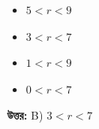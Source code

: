 \documentclass[12pt, a4paper]{article}
\begin{document}
\begin{itemize}[label={}, leftmargin=1cm, itemsep=0.5em]
    \item[\textbf{A)}] $5 < r < 9$
    \item[\textbf{B)}] $3 < r < 7$
    \item[\textbf{C)}] $1 < r < 9$
    \item[\textbf{D)}] $0 < r < 7$
\end{itemize}

\vspace{0.5em}
\begin{tcolorbox}[answerbox]
    \textbf{\color{success} উত্তর:} B) $3 < r < 7$
\end{tcolorbox}
\vspace{1em}
\end{document}
